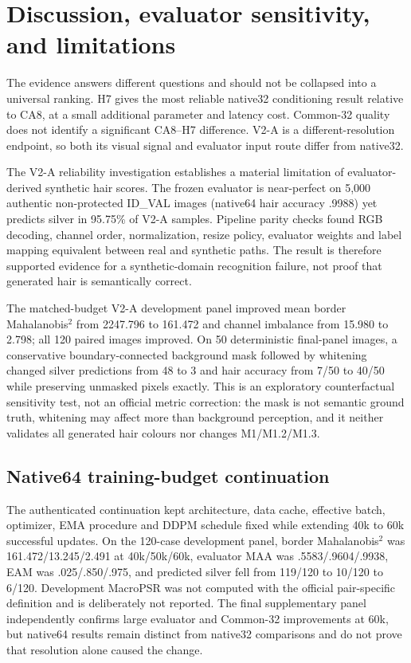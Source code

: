 \section{Discussion, evaluator sensitivity, and limitations}\label{sec:discussion}
The evidence answers different questions and should not be collapsed into a universal ranking. H7 gives the most reliable native32 conditioning result relative to CA8, at a small additional parameter and latency cost. Common-32 quality does not identify a significant CA8--H7 difference. V2-A is a different-resolution endpoint, so both its visual signal and evaluator input route differ from native32.

The V2-A reliability investigation establishes a material limitation of evaluator-derived synthetic hair scores. The frozen evaluator is near-perfect on 5,000 authentic non-protected ID\_VAL images (native64 hair accuracy .9988) yet predicts silver in 95.75\% of V2-A samples. Pipeline parity checks found RGB decoding, channel order, normalization, resize policy, evaluator weights and label mapping equivalent between real and synthetic paths. The result is therefore supported evidence for a synthetic-domain recognition failure, not proof that generated hair is semantically correct.

The matched-budget V2-A development panel improved mean border Mahalanobis$^2$ from 2247.796 to 161.472 and channel imbalance from 15.980 to 2.798; all 120 paired images improved. On 50 deterministic final-panel images, a conservative boundary-connected background mask followed by whitening changed silver predictions from 48 to 3 and hair accuracy from 7/50 to 40/50 while preserving unmasked pixels exactly. This is an exploratory counterfactual sensitivity test, not an official metric correction: the mask is not semantic ground truth, whitening may affect more than background perception, and it neither validates all generated hair colours nor changes M1/M1.2/M1.3.

\subsection{Native64 training-budget continuation}
The authenticated continuation kept architecture, data cache, effective batch, optimizer, EMA procedure and DDPM schedule fixed while extending 40k to 60k successful updates. On the 120-case development panel, border Mahalanobis$^2$ was 161.472/13.245/2.491 at 40k/50k/60k, evaluator MAA was .5583/.9604/.9938, EAM was .025/.850/.975, and predicted silver fell from 119/120 to 10/120 to 6/120. Development MacroPSR was not computed with the official pair-specific definition and is deliberately not reported. The final supplementary panel independently confirms large evaluator and Common-32 improvements at 60k, but native64 results remain distinct from native32 comparisons and do not prove that resolution alone caused the change.
